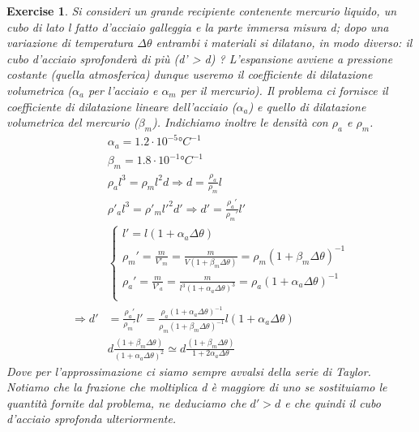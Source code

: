 \documentclass[10pt,a4paper]{article}
\newtheorem{exercise}{Exercise}
\begin{document}
\begin{exercise}
Si consideri un grande recipiente contenente mercurio liquido, un cubo di lato l fatto d'acciaio galleggia e la parte immersa misura d; dopo una variazione di temperatura $\Delta \theta$ entrambi i materiali si dilatano, in modo diverso: il cubo d'acciaio sprofonderà di più (d' > d) ? L'espansione avviene a pressione costante (quella atmosferica) dunque useremo il coefficiente di dilatazione volumetrica ($\alpha_a$ per l'acciaio e $\alpha_m$ per il mercurio). Il problema ci fornisce il coefficiente di dilatazione lineare dell'acciaio ($\alpha_a$) e quello di dilatazione volumetrica del mercurio ($\beta_m$). Indichiamo inoltre le densità con $\rho_a$ e $\rho_m$.
\begin{align*} 
	&\alpha_a = 1.2 \cdot 10^{-5} °C^{-1}\\
	&\beta_m = 1.8 \cdot 10^{-1} °C^{-1}\\
	&\rho_a l^3 = \rho_m l^2 d \Rightarrow d = \frac{\rho_a}{\rho_m} l\\
	&\rho'_a l^3 = \rho'_m l'^2 d' \Rightarrow d' = \frac{\rho_a'}{\rho_m'} l'\\
	&\begin{cases}
		l' = l (1 + \alpha_a \Delta \theta)\\
		\rho_m' = \frac{m }{V'_m} = \frac{m}{V (1 + \beta_m \Delta \theta)} = \rho_m (1 + \beta_m \Delta \theta)^{-1}\\
		\rho_a' = \frac{m }{V'_a} = \frac{m}{l^3 (1 + \alpha_a \Delta \theta)^3} = \rho_a (1 + \alpha_a \Delta \theta)^{-1}\\
	\end{cases}\\
	\Rightarrow d' &= \frac{\rho_a'}{\rho_m'} l' = \frac{\rho_a (1 + \alpha_a \Delta \theta)^{-1}}{\rho_m (1 + \beta_m \Delta \theta)^{-1}} l (1 + \alpha_a \Delta \theta)\\
	&d \frac{(1 + \beta_m \Delta \theta)}{(1 + \alpha_a \Delta \theta)^2}\simeq d \frac{(1 + \beta_m  \Delta \theta)}{1+2 \alpha_a \Delta \theta}
\end{align*}  
Dove per l'approssimazione ci siamo sempre avvalsi della serie di Taylor. Notiamo che la frazione che moltiplica d è maggiore di uno se sostituiamo le quantità fornite dal problema, ne deduciamo che $d' > d$ e che quindi il cubo d'acciaio sprofonda ulteriormente. 
\end{exercise} 
\end{document}
